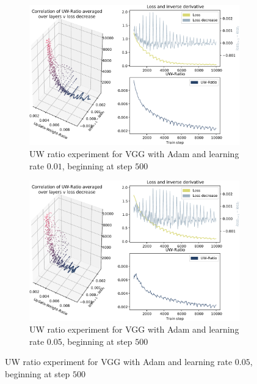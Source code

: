 \begin{figure}
    \begin{subfigure}{\textwidth}
        \centering
        \includegraphics[width=\linewidth]{gfx/diagrams/experiments/ratio_loss_correlation/vgg_adam_001_500_10000.pdf}
        \caption{UW ratio experiment for VGG with Adam and learning rate $0.01$,
        beginning at step $500$}
        \label{fig:ratio_loss_corr_vgg_adam_001_500}
    \end{subfigure}

    \begin{subfigure}{\textwidth}
        \centering
        \includegraphics[width=\linewidth]{gfx/diagrams/experiments/ratio_loss_correlation/vgg_adam_005_500_10000.pdf}
        \caption{UW ratio experiment for VGG with Adam and learning rate $0.05$,
        beginning at step $500$}
        \label{fig:ratio_loss_corr_vgg_adam_005_500}
    \end{subfigure}


\end{figure}
